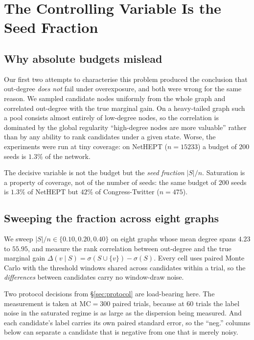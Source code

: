 \section{The Controlling Variable Is the Seed Fraction}
\label{sec:regime}

\subsection{Why absolute budgets mislead}

Our first two attempts to characterise this problem produced the conclusion that out-degree
\emph{does not} fail under overexposure, and both were wrong for the same reason. We sampled
candidate nodes uniformly from the whole graph and correlated out-degree with the true marginal
gain. On a heavy-tailed graph such a pool consists almost entirely of low-degree nodes, so the
correlation is dominated by the global regularity ``high-degree nodes are more valuable'' rather
than by any ability to rank candidates under a given state. Worse, the experiments were run at
tiny coverage: on NetHEPT ($n = 15233$) a budget of $200$ seeds is $1.3\%$ of the network.

The decisive variable is not the budget but the \emph{seed fraction} $|S|/n$. Saturation is a
property of coverage, not of the number of seeds: the same budget of $200$ seeds is $1.3\%$ of
NetHEPT but $42\%$ of Congress-Twitter ($n = 475$).

\subsection{Sweeping the fraction across eight graphs}

We sweep $|S|/n \in \{0.10, 0.20, 0.40\}$ on eight graphs whose mean degree spans $4.23$ to
$55.95$, and measure the rank correlation between out-degree and the true marginal gain
$\Delta(v \mid S) = \sigma(S \cup \{v\}) - \sigma(S)$. Every cell uses paired Monte Carlo with the
threshold windows shared across candidates within a trial, so the \emph{differences} between
candidates carry no window-draw noise.

Two protocol decisions from \S\ref{sec:protocol} are load-bearing here. The measurement is taken at
$\mathrm{MC} = 300$ paired trials, because at $60$ trials the label noise in the saturated regime is
as large as the dispersion being measured. And each candidate's label carries its own paired
standard error, so the ``neg.'' columns below can separate a candidate that is negative from one
that is merely noisy.

